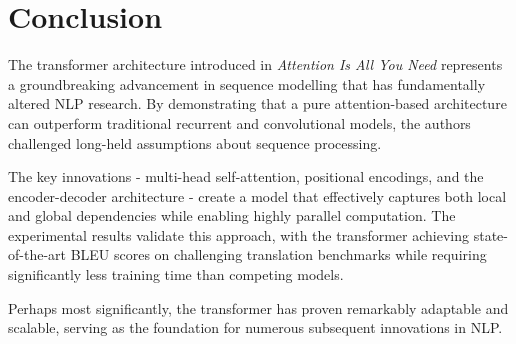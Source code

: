 \section{Conclusion}

The transformer architecture introduced in \textit{Attention Is All You Need} represents a groundbreaking advancement in sequence modelling that has fundamentally altered NLP research. By demonstrating that a pure attention-based architecture can outperform traditional recurrent and convolutional models, the authors challenged long-held assumptions about sequence processing.

The key innovations - multi-head self-attention, positional encodings, and the encoder-decoder architecture - create a model that effectively captures both local and global dependencies while enabling highly parallel computation. The experimental results validate this approach, with the transformer achieving state-of-the-art BLEU scores on challenging translation benchmarks while requiring significantly less training time than competing models.

Perhaps most significantly, the transformer has proven remarkably adaptable and scalable, serving as the foundation for numerous subsequent innovations in NLP.
